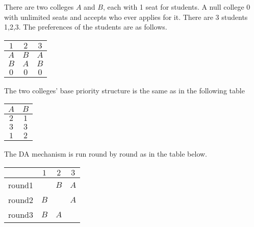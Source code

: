 \begin{example}
There are two colleges $A$ and $B$, each with 1 seat for students. A null college $0$ with unlimited seats and accepts who ever applies for it. There are
3 students 1,2,3. The preferences of the students are
as follows.

    \begin{center}
      \begin{tabular}{|c|c|c|}
        \hline
        $1$ & $2$ & $3$ \\
        \hline
        $A$ & $B$ & $A$ \\
        
        $B$ & $A$ & $B$ \\

        $0$ & $0$ & $0$ \\

        \hline
        
      \end{tabular}
    \end{center}

The two colleges' base priority structure is the same as in the following
table

 \begin{center}
      \begin{tabular}{|c|c|}
        \hline
         $A$ & $B$ \\
        \hline
        $2$ & $1$\\
        
        $3$ & $3$ \\

        $1$ & $2$ \\
       
        \hline
        
      \end{tabular}
    \end{center}
 
The DA mechanism is run round by round as in the table below.

 \begin{center}
      \begin{tabular}{|c|c|c|c|}
        \hline
        &$1$ & $2$ & $3$\\
        \hline
       round1&   & $B$ & $A$ \\
        
        round2&$B$ &  & $A$ \\

        round3&$B$ & $A$  & \\


\end{tabular}
\end{center}
\end{example}
